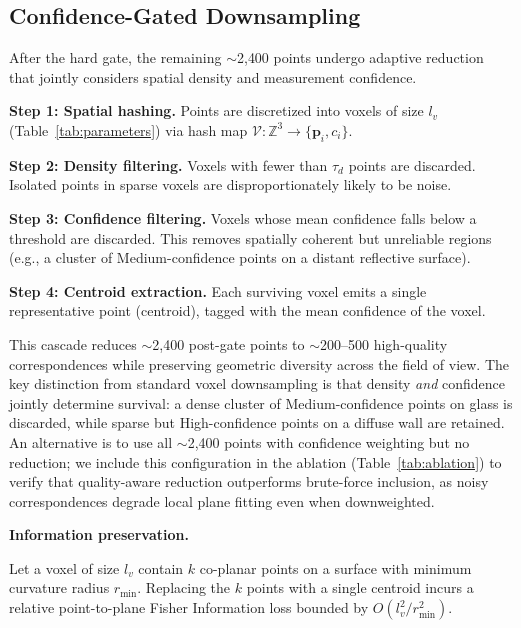 \documentclass[journal]{IEEEtran}
\begin{document}
\subsection{Confidence-Gated Downsampling}
\label{sec:cgd}

After the hard gate, the remaining ${\sim}$2{,}400 points undergo adaptive reduction that jointly considers spatial density and measurement confidence.

\textbf{Step 1: Spatial hashing.} Points are discretized into voxels of size $l_v$ (Table~\ref{tab:parameters}) via hash map $\mathcal{V}: \mathbb{Z}^3 \rightarrow \{\mathbf{p}_i, c_i\}$.

\textbf{Step 2: Density filtering.} Voxels with fewer than $\tau_d$ points are discarded. Isolated points in sparse voxels are disproportionately likely to be noise.

\textbf{Step 3: Confidence filtering.} Voxels whose mean confidence falls below a threshold are discarded. This removes spatially coherent but unreliable regions (e.g., a cluster of Medium-confidence points on a distant reflective surface).

\textbf{Step 4: Centroid extraction.} Each surviving voxel emits a single representative point (centroid), tagged with the mean confidence of the voxel.

This cascade reduces ${\sim}$2{,}400 post-gate points to ${\sim}$200--500 high-quality correspondences while preserving geometric diversity across the field of view. The key distinction from standard voxel downsampling is that density \emph{and} confidence jointly determine survival: a dense cluster of Medium-confidence points on glass is discarded, while sparse but High-confidence points on a diffuse wall are retained. An alternative is to use all ${\sim}$2{,}400 points with confidence weighting but no reduction; we include this configuration in the ablation (Table~\ref{tab:ablation}) to verify that quality-aware reduction outperforms brute-force inclusion, as noisy correspondences degrade local plane fitting even when downweighted.

\textbf{Information preservation.}

\begin{lemma}
\label{lem:cgd}
Let a voxel of size $l_v$ contain $k$ co-planar points on a surface with minimum curvature radius $r_{\min}$. Replacing the $k$ points with a single centroid incurs a relative point-to-plane Fisher Information loss bounded by $O(l_v^2 / r_{\min}^2)$.
\end{lemma}
\end{document}
